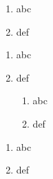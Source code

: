 \begin{enumerate}[label=(\alph{*})]
    \item abc
    \item def
\end{enumerate}
\begin{enumerate}[label=(\Alph{*})]
    \item abc
    \item def
    \begin{enumerate}[label=(\roman{*})]
        \item abc
        \item def
    \end{enumerate}
\end{enumerate}
\begin{enumerate}[label=(\arabic{*})]
    \item abc
    \item def
\end{enumerate}